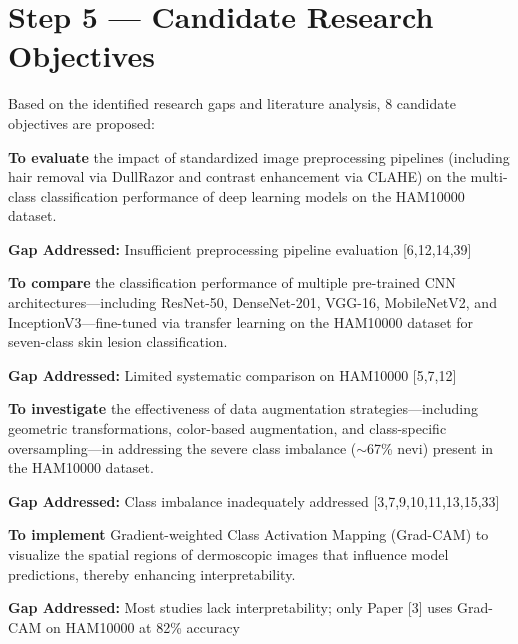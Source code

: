 \documentclass[11pt,a4paper]{article}
\begin{document}
\newpage

\section{Step 5 --- Candidate Research Objectives}
\label{sec:step5}

Based on the identified research gaps and literature analysis, 8 candidate objectives are proposed:

\begin{objectivebox}
\textbf{To evaluate} the impact of standardized image preprocessing pipelines (including hair removal via DullRazor and contrast enhancement via CLAHE) on the multi-class classification performance of deep learning models on the HAM10000 dataset.

\smallskip
\textbf{Gap Addressed:} Insufficient preprocessing pipeline evaluation [6,12,14,39]
\end{objectivebox}

\begin{objectivebox}
\textbf{To compare} the classification performance of multiple pre-trained CNN architectures---including ResNet-50, DenseNet-201, VGG-16, MobileNetV2, and InceptionV3---fine-tuned via transfer learning on the HAM10000 dataset for seven-class skin lesion classification.

\smallskip
\textbf{Gap Addressed:} Limited systematic comparison on HAM10000 [5,7,12]
\end{objectivebox}

\begin{objectivebox}
\textbf{To investigate} the effectiveness of data augmentation strategies---including geometric transformations, color-based augmentation, and class-specific oversampling---in addressing the severe class imbalance ($\sim$67\% nevi) present in the HAM10000 dataset.

\smallskip
\textbf{Gap Addressed:} Class imbalance inadequately addressed [3,7,9,10,11,13,15,33]
\end{objectivebox}

\begin{objectivebox}
\textbf{To implement} Gradient-weighted Class Activation Mapping (Grad-CAM) to visualize the spatial regions of dermoscopic images that influence model predictions, thereby enhancing interpretability.

\smallskip
\textbf{Gap Addressed:} Most studies lack interpretability; only Paper [3] uses Grad-CAM on HAM10000 at 82\% accuracy
\end{objectivebox}
\end{document}
